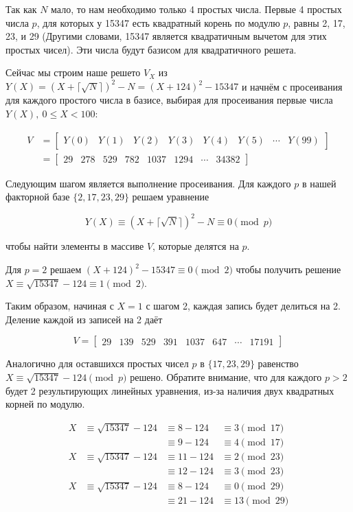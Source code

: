 \documentclass[12pt,a4paper]{scrartcl}
\begin{document}
Так как $N$ мало, то нам необходимо только 4 простых числа. Первые 4 простых числа $p$, для которых у 15347 есть квадратный корень по модулю $p$, равны 2, 17, 23, и 29 (Другими словами, 15347 является квадратичным вычетом для этих простых чисел). Эти числа будут базисом для квадратичного решета.

Сейчас мы строим наше решето $V_{X}$ из $Y(X)=(X+\lceil {\sqrt {N}}\rceil )^{2}-N=(X+124)^{2}-15347$ и начнём с просеивания для каждого простого числа в базисе, выбирая для просеивания первые числа $Y(X),\ 0 \leq X < 100$:

$$ {\begin{aligned}V&={\begin{bmatrix}Y(0)&Y(1)&Y(2)&Y(3)&Y(4)&Y(5)&\cdots &Y(99)\end{bmatrix}}\\&={\begin{bmatrix}29&278&529&782&1037&1294&\cdots &34382\end{bmatrix}}\end{aligned}}$$

Следующим шагом является выполнение просеивания. Для каждого $p$ в нашей факторной базе $\lbrace 2,17,23,29\rbrace$ решаем уравнение

$$Y(X)\equiv (X+\lceil {\sqrt {N}}\rceil )^{2}-N\equiv 0{\pmod {p}}$$

чтобы найти элементы в массиве $V$, которые делятся на $p$.

Для $p=2$ решаем $(X+124)^{2}-15347\equiv 0{\pmod {2}}$ чтобы получить решение $X\equiv {\sqrt {15347}}-124\equiv 1{\pmod {2}}$.

Таким образом, начиная с $X=1$ с шагом 2, каждая запись будет делиться на 2. Деление каждой из записей на 2 даёт

$$V={\begin{bmatrix}29&139&529&391&1037&647&\cdots &17191\end{bmatrix}}$$

Аналогично для оставшихся простых чисел $p$ в $\lbrace 17,23,29\rbrace$ равенство $X\equiv {\sqrt {15347}}-124{\pmod {p}}$ решено. Обратите внимание, что для каждого $p > 2$ будет 2 результирующих линейных уравнения, из-за наличия двух квадратных корней по модулю.

$${\begin{aligned}X&\equiv {\sqrt {15347}}-124&\equiv 8-124&\equiv 3{\pmod {17}}\\&&\equiv 9-124&\equiv 4{\pmod {17}}\\X&\equiv {\sqrt {15347}}-124&\equiv 11-124&\equiv 2{\pmod {23}}\\&&\equiv 12-124&\equiv 3{\pmod {23}}\\X&\equiv {\sqrt {15347}}-124&\equiv 8-124&\equiv 0{\pmod {29}}\\&&\equiv 21-124&\equiv 13{\pmod {29}}\\\end{aligned}}$$
\end{document}
